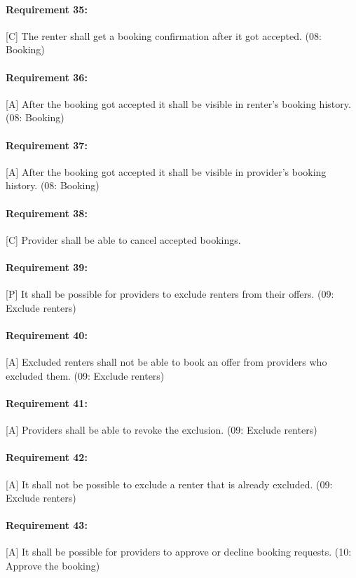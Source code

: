\paragraph{Requirement 35:} [C] The renter shall get a booking confirmation after it got accepted. (08: Booking)
\paragraph{Requirement 36:} [A] After the booking got accepted it shall be visible in renter's booking history. (08: Booking)
\paragraph{Requirement 37:} [A] After the booking got accepted it shall be visible in provider's booking history. (08: Booking)
\paragraph{Requirement 38:} [C] Provider shall be able to cancel accepted bookings.


\paragraph{Requirement 39:} [P] It shall be possible for providers to exclude renters from their offers. (09: Exclude renters)
\paragraph{Requirement 40:} [A] Excluded renters shall not be able to book an offer from providers who excluded them. (09: Exclude renters)
\paragraph{Requirement 41:} [A] Providers shall be able to revoke the exclusion. (09: Exclude renters)
\paragraph{Requirement 42:} [A] It shall not be possible to exclude a renter that is already excluded. (09: Exclude renters)

\paragraph{Requirement 43:} [A] It shall be possible for providers to approve or decline booking requests. (10: Approve the booking)
